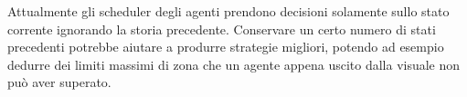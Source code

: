 Attualmente gli scheduler degli agenti prendono decisioni solamente sullo stato corrente ignorando la storia precedente. Conservare un certo numero di stati precedenti potrebbe aiutare a produrre strategie migliori, potendo ad esempio dedurre dei limiti massimi di zona che un agente appena uscito dalla visuale non può aver superato.
